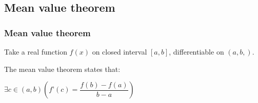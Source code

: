 
\subsection{Mean value theorem}

\subsubsection{Mean value theorem}

Take a real function \(f(x)\) on closed interval \([a,b]\), differentiable on \((a,b,)\).

The mean value theorem states that:

\(\exists c\in(a,b) (f’(c)=\dfrac{f(b)-f(a)}{b-a})\)

